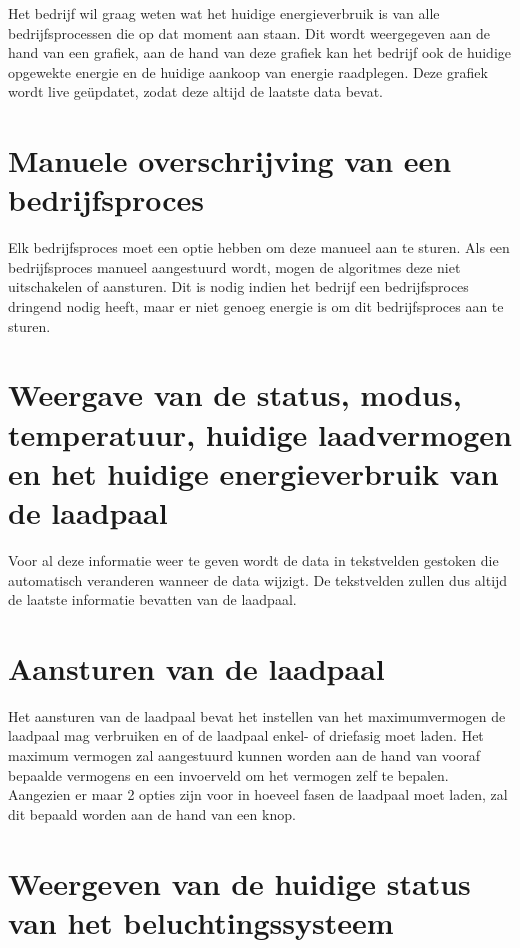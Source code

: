 Het bedrijf wil graag weten wat het huidige energieverbruik is van alle bedrijfsprocessen die op dat moment aan staan. Dit wordt weergegeven aan de hand van een grafiek, aan de hand van deze grafiek kan het bedrijf ook de huidige opgewekte energie en de huidige aankoop van energie raadplegen. Deze grafiek wordt live geüpdatet, zodat deze altijd de laatste data bevat.

\section{Manuele overschrijving van een bedrijfsproces}
\label{sec:manuele-overschrijving-van-een-bedrijfsproces}

Elk bedrijfsproces moet een optie hebben om deze manueel aan te sturen. Als een bedrijfsproces manueel aangestuurd wordt, mogen de algoritmes deze niet uitschakelen of aansturen. Dit is nodig indien het bedrijf een bedrijfsproces dringend nodig heeft, maar er niet genoeg energie is om dit bedrijfsproces aan te sturen.

\section{Weergave van de status, modus, temperatuur, huidige laadvermogen en het huidige energieverbruik van de laadpaal}
\label{sec:weergave-van-de-status-van-de-laadpaal}

Voor al deze informatie weer te geven wordt de data in tekstvelden gestoken die automatisch veranderen wanneer de data wijzigt. De tekstvelden zullen dus altijd de laatste informatie bevatten van de laadpaal.

\section{Aansturen van de laadpaal}
\label{sec:aansturen-van-de-laadpaal}

Het aansturen van de laadpaal bevat het instellen van het maximumvermogen de laadpaal mag verbruiken en of de laadpaal enkel- of driefasig moet laden. Het maximum vermogen zal aangestuurd kunnen worden aan de hand van vooraf bepaalde vermogens en een invoerveld om het vermogen zelf te bepalen. Aangezien er maar 2 opties zijn voor in hoeveel fasen de laadpaal moet laden, zal dit bepaald worden aan de hand van een knop.

\section{Weergeven van de huidige status van het beluchtingssysteem}
\label{sec:weergeven-van-de-huidige-status-van-het-beluchtingssysteem}

